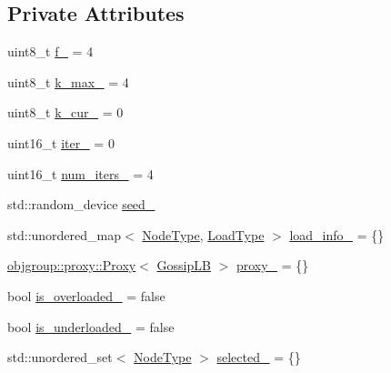 \subsection*{Private Attributes}
\begin{DoxyCompactItemize}
\item 
uint8\+\_\+t \hyperlink{structvt_1_1vrt_1_1collection_1_1lb_1_1_gossip_l_b_a8e583b068a5241bf1960866c731e40d8}{f\+\_\+} = 4
\item 
uint8\+\_\+t \hyperlink{structvt_1_1vrt_1_1collection_1_1lb_1_1_gossip_l_b_a7871082bff02cbd26afe36d52a0b4304}{k\+\_\+max\+\_\+} = 4
\item 
uint8\+\_\+t \hyperlink{structvt_1_1vrt_1_1collection_1_1lb_1_1_gossip_l_b_aad96c8f2fc0c8ab0c2131da76bc01421}{k\+\_\+cur\+\_\+} = 0
\item 
uint16\+\_\+t \hyperlink{structvt_1_1vrt_1_1collection_1_1lb_1_1_gossip_l_b_af534fb854364c488b92716c7ff087abf}{iter\+\_\+} = 0
\item 
uint16\+\_\+t \hyperlink{structvt_1_1vrt_1_1collection_1_1lb_1_1_gossip_l_b_afd144df8d35532ba73746dd1d8bf6e6f}{num\+\_\+iters\+\_\+} = 4
\item 
std\+::random\+\_\+device \hyperlink{structvt_1_1vrt_1_1collection_1_1lb_1_1_gossip_l_b_abd01127dcc3adcb07a8ff16465068443}{seed\+\_\+}
\item 
std\+::unordered\+\_\+map$<$ \hyperlink{namespacevt_a866da9d0efc19c0a1ce79e9e492f47e2}{Node\+Type}, \hyperlink{structvt_1_1vrt_1_1collection_1_1lb_1_1_base_l_b_a215e22b9f12678303f49615ae3be05cc}{Load\+Type} $>$ \hyperlink{structvt_1_1vrt_1_1collection_1_1lb_1_1_gossip_l_b_abfa1681074e4b0388be84f87b7cd7f25}{load\+\_\+info\+\_\+} = \{\}
\item 
\hyperlink{structvt_1_1objgroup_1_1proxy_1_1_proxy}{objgroup\+::proxy\+::\+Proxy}$<$ \hyperlink{structvt_1_1vrt_1_1collection_1_1lb_1_1_gossip_l_b}{Gossip\+LB} $>$ \hyperlink{structvt_1_1vrt_1_1collection_1_1lb_1_1_gossip_l_b_a334ddc77cb6dc72408d0ee089869ffe1}{proxy\+\_\+} = \{\}
\item 
bool \hyperlink{structvt_1_1vrt_1_1collection_1_1lb_1_1_gossip_l_b_a432ef6985a152c97c60184a3ccbda082}{is\+\_\+overloaded\+\_\+} = false
\item 
bool \hyperlink{structvt_1_1vrt_1_1collection_1_1lb_1_1_gossip_l_b_a8cbe2b210b71f7261240325ebbf81cd7}{is\+\_\+underloaded\+\_\+} = false
\item 
std\+::unordered\+\_\+set$<$ \hyperlink{namespacevt_a866da9d0efc19c0a1ce79e9e492f47e2}{Node\+Type} $>$ \hyperlink{structvt_1_1vrt_1_1collection_1_1lb_1_1_gossip_l_b_a11e92bfca8ee25075fc14af35cd4a5ff}{selected\+\_\+} = \{\}

\end{DoxyCompactItemize}

